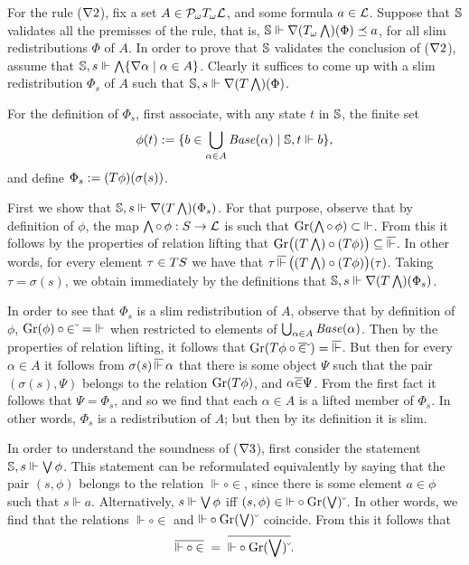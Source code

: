 \documentclass{book}
\begin{document}
For the rule ($\nabla2$), fix a set $A \in
\mathcal{P}_{\omega}T_{\omega}\mathcal{L}$, and some formula $a\in \mathcal{L}$.
Suppose that $\mathbb{S}$ validates all the premisses of the rule, that
is, $\mathbb{S} \Vdash \nabla (T_{\omega}\bigwedge)(\Phi) \preceq a$, for
all slim redistributions $\Phi$ of $A$.  In order to prove that
$\mathbb{S}$ validates the conclusion of ($\nabla2$), assume that
$\mathbb{S},s \Vdash \bigwedge \{ \nabla\alpha \mid \alpha \in A \}$.
Clearly it suffices to come up with a slim redistribution $\Phi_{s}$
of $A$ such that $\mathbb{S},s \Vdash \nabla (T\bigwedge)(\Phi)$.

For the definition of $\Phi_{s}$, first associate, with any state $t$
in $\mathbb{S}$, the finite set 
\[
\phi(t) := \{ b \in \bigcup_{\alpha\in A} \mathit{Base}(\alpha) \mid \mathbb{S},t 
\Vdash b \},
\]
and define $\Phi_{s} := (T\phi)(\sigma(s))$.

First we show that $\mathbb{S},s \Vdash \nabla (T\bigwedge)(\Phi_{s})$.
For that purpose, observe that by definition of $\phi$, the map 
$\bigwedge\circ\,\phi:
S \to \mathcal{L}$ is such that $\mathrm{Gr}(\bigwedge\circ\,\phi) \subset {\Vdash}$.
From this it follows by the properties of relation lifting that $\mathrm{Gr} 
\big( (T\bigwedge) \circ (T\phi) \big) \subseteq \overline{\Vdash}$.
In other words, for every element $\tau \in T S$ we have that $\tau 
\,\overline{\Vdash}\, \big( (T\bigwedge) \circ (T\phi) \big) (\tau)$.
Taking $\tau = \sigma(s)$, we obtain immediately by the definitions that
$\mathbb{S},s \Vdash \nabla (T\bigwedge)(\Phi_{s})$.

In order to see that $\Phi_{s}$ is a slim redistribution of $A$, observe
that by definition of $\phi$, $\mathrm{Gr}(\phi)\circ {\in}\breve{\hspace*{1mm}}
= {\Vdash}$ when restricted to elements of $\bigcup_{\alpha\in A}
\mathit{Base}(\alpha)$.  Then by the properties of relation lifting, it
follows that $\mathrm{Gr}(T\phi \circ \overline{\in}\breve{\hspace*{1mm}}) =
\overline{\Vdash}$.  But then for every $\alpha\in A$ it follows from
$\sigma(s)\,\overline{\Vdash}\, \alpha$ that there is some object $\Psi$
such that the pair $(\sigma(s),\Psi)$ belongs to the relation
$\mathrm{Gr}(T\phi)$, and $\alpha \overline{{\in}}\Psi$.  From the
first fact it follows that $\Psi = \Phi_{s}$, and so we find that each
$\alpha\in A$ is a lifted member of $\Phi_{s}$.  In other words,
$\Phi_{s}$ is a redistribution of $A$; but then by its definition it
is slim.

In order to understand the soundness of ($\nabla3$), first consider
the statement $\mathbb{S},s \Vdash \bigvee\phi$.  This statement can be
reformulated equivalently by saying that the pair $(s,\phi)$ belongs
to the relation ${\Vdash} \circ {\in}$, since there is some element
$a\in\phi$ such that $s \Vdash a$.  Alternatively, $s \Vdash
\bigvee\phi$ iff $(s,\phi) \in {\Vdash} \circ
\mathrm{Gr}(\bigvee)\breve{\hspace*{1mm}}$.  In other words, we find that the
relations ${\Vdash} \circ {\in}$ and ${\Vdash} \circ
\mathrm{Gr}(\bigvee)\breve{\hspace*{1mm}}$ coincide.  From this it follows that
\begin{equation}
\label{eq:soundbv}
\overline{{\Vdash} \circ {\in}} \;=\;
\overline{{\Vdash}\circ \mathrm{Gr}(\bigvee)\breve{\hspace*{1mm}}}.
\end{equation}
\end{document}
